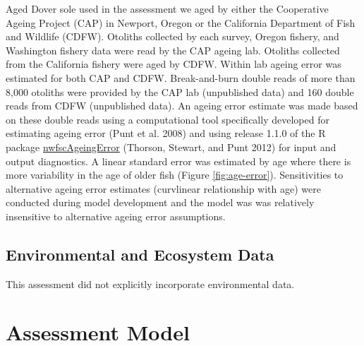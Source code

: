 \documentclass[11pt,
  english,
  a4paper,
]{article}
\begin{document}
Aged Dover sole used in the assessment we aged by either the Cooperative Ageing Project (CAP) in Newport, Oregon or the California Department of Fish and Wildlife (CDFW). Otoliths collected by each survey, Oregon fishery, and Washington fishery data were read by the CAP ageing lab. Otoliths collected from the California fishery were aged by CDFW. Within lab ageing error was estimated for both CAP and CDFW. Break-and-burn double reads of more than 8,000 otoliths were provided by the CAP lab (unpublished data) and 160 double reads from CDFW (unpublished data). An ageing error estimate was made based on these double reads using a computational tool specifically developed for estimating ageing error {(Punt et al. 2008)\leavevmode\tagmcend\tagstructend} and using release 1.1.0 of the R package \href{https://github.com/nwfsc-assess/nwfscAgeingError}{nwfscAgeingError} {(Thorson, Stewart, and Punt 2012)\leavevmode\tagmcend\tagstructend} for input and output diagnostics. A linear standard error was estimated by age where there is more variability in the age of older fish (Figure \ref{fig:age-error}). Sensitivities to alternative ageing error estimates (curvlinear relationship with age) were conducted during model development and the model was was relatively insensitive to alternative ageing error assumptions.

\leavevmode\tagmcend\tagstructend\par


\hypertarget{environmental-and-ecosystem-data}{%
\subsection{Environmental and Ecosystem Data}\label{environmental-and-ecosystem-data}}

\leavevmode\tagmcend\tagstructend


This assessment did not explicitly incorporate environmental data.

\leavevmode\tagmcend\tagstructend\par


\hypertarget{assessment-model}{%
\section{Assessment Model}\label{assessment-model}}
\end{document}
